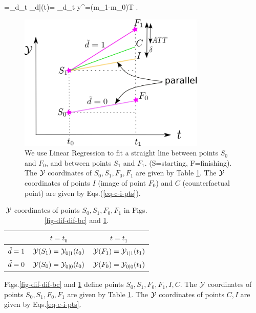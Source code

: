 \beq
\delta=\Delta_d\Delta_t \calm\caly_{d|\td}(t)=
\Delta_d\Delta_t y^\s=(m_1-m_0)T
\;.
\eeq



\begin{figure}[h!]
\centering
\includegraphics[width=3.5in]
{did/parallel-trends.png}
\caption{We use
Linear Regression
to fit a straight line
between points $S_0$
and $F_0$,
and between points
$S_1$ and $F_1$.
(S=starting, F=finishing).
The ${\cal Y}$
coordinates
of $S_0, S_1, F_0, F_1$
are given by Table \ref{tab-did-points}.
The ${\cal Y}$
coordinates of points
$I$ (image of point $F_0$)
and $C$ (counterfactual point)
are 
given by Eqs.(\ref{eq-c-i-pts}).
} 
\label{fig-parallel-trends}
\end{figure}

\begin{table}[h!]
\centering
{\renewcommand{\arraystretch}{1.2}
\begin{tabular}{|c|c|c|}
\hline 
\rowcolor[HTML]{ECF4FF} 
 & $t=t_0$ & $t=t_1$ \\ 
\hline
${\tilde{d}}=1$ \cellcolor[HTML]{ECF4FF}& ${\cal Y}(S_1)={\cal Y}_{0|1}(t_0)$ & ${\cal Y}(F_1)={\cal Y}_{1|1}(t_1)$ \\ 
\hline 
${\tilde{d}}=0$\cellcolor[HTML]{ECF4FF} & ${\cal Y}(S_0)={\cal Y}_{0|0}(t_0)$ & ${\cal Y}(F_0)={\cal Y}_{0|0}(t_1)$ \\ 
\hline 
\end{tabular}
}
\caption{
${\cal Y}$ coordinates
of points
$S_0, S_1, F_0, F_1$
in Figs.\ref{fig-dif-dif-bc}
 and \ref{fig-parallel-trends}.
}
\label{tab-did-points}
\end{table}



Figs.\ref{fig-dif-dif-bc} and
\ref{fig-parallel-trends}
define
points $S_0, S_1, F_0, F_1, I, C$.
The ${\cal Y}$
coordinates of points 
$S_0, S_1, F_0, F_1$ are 
given by
Table \ref{tab-did-points}.
The ${\cal Y}$
coordinates of points $C,I$
are given by Eqs.\ref{eq-c-i-pts}.

